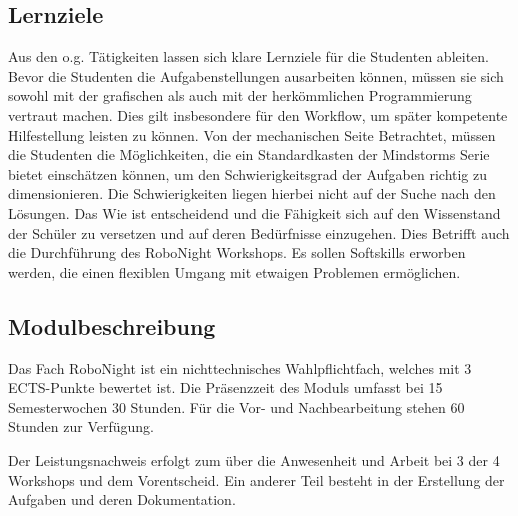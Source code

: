 \subsection{Lernziele}
 Aus den o.g. Tätigkeiten lassen sich klare Lernziele für die Studenten ableiten. Bevor die Studenten die Aufgabenstellungen ausarbeiten können, müssen sie sich sowohl mit der grafischen als auch mit der herkömmlichen Programmierung vertraut machen. Dies gilt insbesondere für den Workflow, um später kompetente Hilfestellung leisten zu können. Von der mechanischen Seite Betrachtet, müssen die Studenten die Möglichkeiten, die ein Standardkasten der Mindstorms Serie bietet einschätzen können, um den Schwierigkeitsgrad der Aufgaben richtig zu dimensionieren. Die Schwierigkeiten liegen hierbei nicht auf der Suche nach den Lösungen. Das Wie ist entscheidend und die Fähigkeit sich auf den Wissenstand der Schüler zu versetzen und auf deren Bedürfnisse einzugehen. Dies Betrifft auch die Durchführung des RoboNight Workshops. Es sollen Softskills erworben werden, die einen flexiblen Umgang mit etwaigen Problemen ermöglichen.  


\subsection{Modulbeschreibung}
Das Fach RoboNight ist ein nichttechnisches Wahlpflichtfach, welches mit 3 ECTS-Punkte bewertet ist. Die Präsenzzeit des Moduls umfasst bei 15 Semesterwochen 30 Stunden. Für die Vor- und Nachbearbeitung stehen 60 Stunden zur Verfügung.

Der Leistungsnachweis erfolgt zum über die Anwesenheit und Arbeit bei 3 der 4 Workshops und dem Vorentscheid. Ein anderer Teil besteht in der Erstellung der Aufgaben und deren Dokumentation. \autocite{Quelle: http://moduldb.htw-saarland.de/cgi-bin/moduldb-c?bkeys=yst&ckeys=kdvrw&lang=de}
    
    